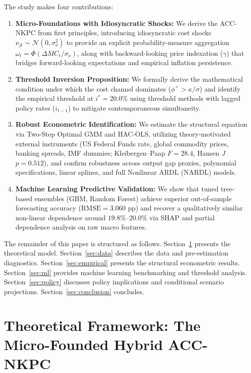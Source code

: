 \documentclass[review,12pt]{elsarticle}
\begin{document}
The study makes four contributions:
\begin{enumerate}[label=\textbf{(\roman*)}]
\item \textbf{Micro-Foundations with Idiosyncratic Shocks:} We derive the ACC-NKPC
from first principles, introducing idiosyncratic cost shocks $\nu_{jt} \sim \mathcal{N}(0,\sigma_\nu^2)$
to provide an explicit probability-measure aggregation $\omega_t = \Phi(\Delta MC_t / \sigma_\nu)$,
along with backward-looking price indexation ($\gamma$) that bridges forward-looking expectations
and empirical inflation persistence.
\item \textbf{Threshold Inversion Proposition:} We formally derive the mathematical
condition under which the cost channel dominates ($\phi^+ > \kappa/\sigma$) and identify
the empirical threshold at $i^* = 20.0\%$ using \citet{hansen2000} threshold methods
with lagged policy rates ($i_{t-1}$) to mitigate contemporaneous simultaneity.
\item \textbf{Robust Econometric Identification:} We estimate the structural equation
via Two-Step Optimal GMM and HAC-OLS, utilizing theory-motivated external instruments
(US Federal Funds rate, global commodity prices, banking spreads, IMF dummies; Kleibergen--Paap
$F = 28.4$, Hansen $J$ $p = 0.512$), and confirm robustness across \citet{hamilton2018} output
gap proxies, polynomial specifications, linear splines, and full Nonlinear ARDL (NARDL) models.
\item \textbf{Machine Learning Predictive Validation:} We show that tuned tree-based
ensembles (GBM, Random Forest) achieve superior out-of-sample forecasting accuracy
($\text{RMSE}=3.060\text{ pp}$) and recover a qualitatively similar non-linear dependence
around $19.8\%$--$20.0\%$ via SHAP and partial dependence analysis on raw macro features.
\end{enumerate}

The remainder of this paper is structured as follows. Section~\ref{sec:theory}
presents the theoretical model. Section~\ref{sec:data} describes the data and
pre-estimation diagnostics. Section~\ref{sec:empirical} presents the structural
econometric results. Section~\ref{sec:ml} provides machine learning benchmarking
and threshold analysis. Section~\ref{sec:policy} discusses policy implications
and conditional scenario projections. Section~\ref{sec:conclusion} concludes.

\section{Theoretical Framework: The Micro-Founded Hybrid ACC-NKPC}
\label{sec:theory}
\end{document}
